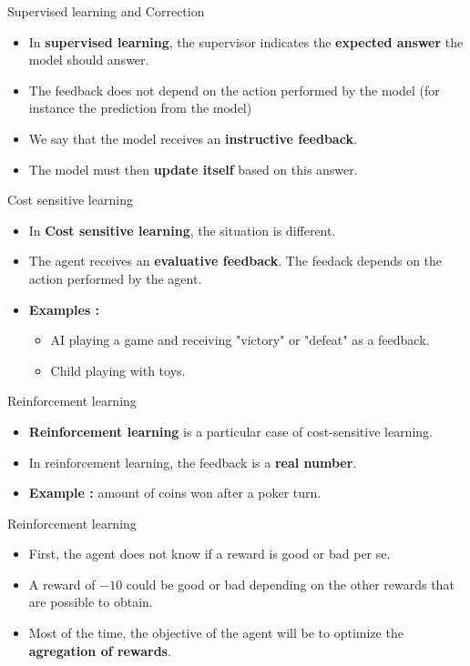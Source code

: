 \documentclass[usenames,dvipsnames]{beamer}
\begin{document}
\begin{frame}{Supervised learning and Correction}
    \begin{itemize}
        \item In \textbf{{supervised learning}}, the supervisor indicates the \textbf{{expected answer}} the model should answer.
	\item The feedback does not depend on the action performed by the model (for instance the prediction from the model)
	\item We say that the model receives an \textbf{{instructive feedback}}.
	\item The model must then \textbf{{update itself}}  based on this answer.
    \end{itemize}
\end{frame}

\begin{frame}{Cost sensitive learning}
   \begin{itemize}
       \item In \textbf{{Cost sensitive learning}}, the situation is different. 
	\item The agent receives an \textbf{{evaluative feedback}}. The feedack depends on the action performed by the agent.
	\item \textbf{{Examples : }}
	    \begin{itemize}
	    \item AI playing a game and receiving "victory" or "defeat" as a feedback.
	    \item Child playing with toys.
	\end{itemize} 
   \end{itemize} 
\end{frame}

\begin{frame}{Reinforcement learning}
   \begin{itemize}
       \item \textbf{{Reinforcement learning}} is a particular case of cost-sensitive learning.
	\item In reinforcement learning, the feedback is a \textbf{{real number}}.
	\item \textbf{{Example : }} amount of coins won after a poker turn.
   \end{itemize} 
\end{frame}

\begin{frame}{Reinforcement learning}
   \begin{itemize}
	\item First, the agent does not know if a reward is good or bad per se.
	\item A reward of $-10$ could be good or bad depending on the other rewards that are possible to obtain.
	\item Most of the time, the objective of the agent will be to optimize the \textbf{{agregation of rewards}}.
   \end{itemize} 
\end{frame}
\end{document}
